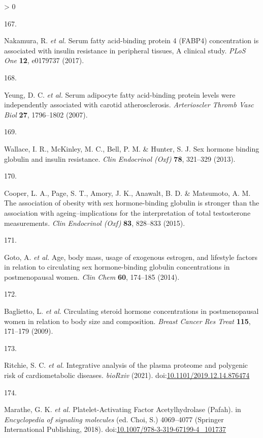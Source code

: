 \documentclass[11pt,twoside]{bristolthesis}
\newlength{\cslhangindent}
\newlength{\csllabelwidth}
\newenvironment{CSLReferences}[2] %
 {%
  \setlength{\parindent}{0pt}
  \ifodd #1 \everypar{\setlength{\hangindent}{\cslhangindent}}\ignorespaces\fi
  \ifnum #2 > 0
  \setlength{\parskip}{#2\baselineskip}
  \fi
 }%
 {}
\newcommand{\CSLLeftMargin}[1]{\parbox[t]{\csllabelwidth}{#1}}
\newcommand{\CSLRightInline}[1]{\parbox[t]{\linewidth - \csllabelwidth}{#1}\break}
\begin{document}
\begin{CSLReferences}{0}{0}
\leavevmode\hypertarget{ref-Nakamura2017}{}%
\CSLLeftMargin{167. }
\CSLRightInline{Nakamura, R. \emph{et al.} {Serum fatty acid-binding protein 4 (FABP4) concentration is associated with insulin resistance in peripheral tissues, A clinical study}. \emph{PLoS One} \textbf{12}, e0179737 (2017).}

\leavevmode\hypertarget{ref-Yeung2007}{}%
\CSLLeftMargin{168. }
\CSLRightInline{Yeung, D. C. \emph{et al.} {Serum adipocyte fatty acid-binding protein levels were independently associated with carotid atherosclerosis}. \emph{Arterioscler Thromb Vasc Biol} \textbf{27}, 1796--1802 (2007).}

\leavevmode\hypertarget{ref-Wallace2013}{}%
\CSLLeftMargin{169. }
\CSLRightInline{Wallace, I. R., McKinley, M. C., Bell, P. M. \& Hunter, S. J. {Sex hormone binding globulin and insulin resistance}. \emph{Clin Endocrinol (Oxf)} \textbf{78}, 321--329 (2013).}

\leavevmode\hypertarget{ref-Cooper2015}{}%
\CSLLeftMargin{170. }
\CSLRightInline{Cooper, L. A., Page, S. T., Amory, J. K., Anawalt, B. D. \& Matsumoto, A. M. {The association of obesity with sex hormone-binding globulin is stronger than the association with ageing--implications for the interpretation of total testosterone measurements}. \emph{Clin Endocrinol (Oxf)} \textbf{83}, 828--833 (2015).}

\leavevmode\hypertarget{ref-Goto2014}{}%
\CSLLeftMargin{171. }
\CSLRightInline{Goto, A. \emph{et al.} {Age, body mass, usage of exogenous estrogen, and lifestyle factors in relation to circulating sex hormone-binding globulin concentrations in postmenopausal women}. \emph{Clin Chem} \textbf{60}, 174--185 (2014).}

\leavevmode\hypertarget{ref-Baglietto2009}{}%
\CSLLeftMargin{172. }
\CSLRightInline{Baglietto, L. \emph{et al.} {Circulating steroid hormone concentrations in postmenopausal women in relation to body size and composition}. \emph{Breast Cancer Res Treat} \textbf{115}, 171--179 (2009).}

\leavevmode\hypertarget{ref-Ritchie2019}{}%
\CSLLeftMargin{173. }
\CSLRightInline{Ritchie, S. C. \emph{et al.} {Integrative analysis of the plasma proteome and polygenic risk of cardiometabolic diseases}. \emph{bioRxiv} (2021). doi:\href{https://doi.org/10.1101/2019.12.14.876474}{10.1101/2019.12.14.876474}}

\leavevmode\hypertarget{ref-Marathe2018}{}%
\CSLLeftMargin{174. }
\CSLRightInline{Marathe, G. K. \emph{et al.} {Platelet-Activating Factor Acetylhydrolase (Pafah)}. in \emph{Encyclopedia of signaling molecules} (ed. Choi, S.) 4069--4077 (Springer International Publishing, 2018). doi:\href{https://doi.org/10.1007/978-3-319-67199-4_101737}{10.1007/978-3-319-67199-4\_101737}}


\end{CSLReferences}
\end{document}
